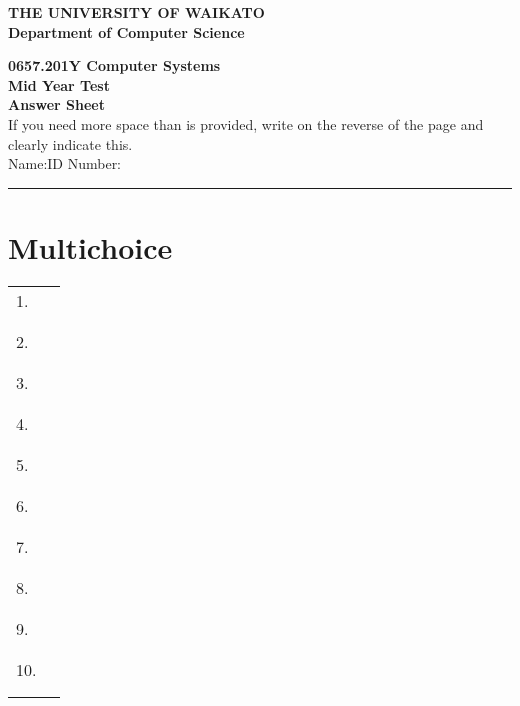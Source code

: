 \documentclass[a4paper,10pt]{article}
\begin{document}
\vspace*{-1cm} 

{\centering \large \bf THE UNIVERSITY OF WAIKATO\\}
{\centering \large \bf Department of Computer Science\\[0.5cm]}

{\centering \large \bf 0657.201Y Computer Systems~\CORYEAR \\}
{\centering \large \bf Mid Year Test~\MIDTESTDATE \\[1cm]}
{\centering \large \bf Answer Sheet\\[5mm]}
If you need more space than is provided, write on the reverse of the
page and clearly indicate this.\\[5mm]
Name:\hspace*{5cm}ID Number:\\
\hrule

\section{Multichoice}

\begin{tabular}{p{1.5cm}|p{2cm}|}
\cline{2-2}
1. &  \\
& \\ & \\
\cline{2-2}
2. &  \\
& \\ & \\
\cline{2-2}
3. &  \\
& \\ & \\
\cline{2-2}
4. &  \\
& \\ & \\
\cline{2-2}
5. &  \\
& \\ & \\ 
\cline{2-2}
6. &  \\
& \\ & \\
\cline{2-2}
7. &  \\
& \\ & \\
\cline{2-2}
8. &  \\
& \\ & \\
\cline{2-2}
9. &  \\
& \\ & \\
\cline{2-2}
10. &  \\
& \\ & \\
\cline{2-2}
\end{tabular}
\end{document}
